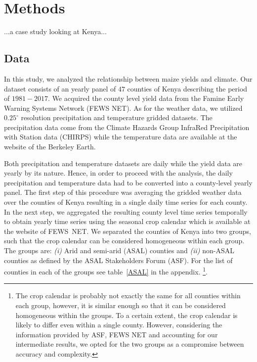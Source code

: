 \documentclass[12pt]{iopart}
\begin{document}
\section{Methods}\label{Methods}
\color{blue}

...a case study looking at Kenya...
\color{black}


 
\subsection{Data}\label{Data}

In this study, we analyzed the relationship between maize yields and climate. Our dataset consists of an yearly panel of $47$ counties of Kenya describing the period of $1981-2017$. 
	We acquired the county level yield data from the Famine Early Warning Systems Network (FEWS NET). As for the weather data, we utilized $0.25^\circ$ resolution precipitation and temperature gridded datasets. The precipitation data come from the Climate Hazards Group InfraRed Precipitation with Station data (CHIRPS) while the temperature data are available at the website of the Berkeley Earth. 
	
	Both precipitation and temperature datasets are daily while the yield data are yearly by its nature. Hence, in order to proceed with the analysis, the daily precipitation and temperature data had to be converted
into a county-level yearly panel. The first step of this procedure was averaging the gridded weather data over the counties of Kenya resulting in a single daily time series for each county. In the next step, we aggregated the resulting county level time series temporally to obtain yearly time series using the seasonal crop calendar which is available at the website of FEWS~NET. We separated the counties of Kenya into two groups, such that the crop calendar can be considered homogeneous within each group. The groups are: \textit{(i)} Arid and semi-arid (ASAL) counties and \textit{(ii)} non-ASAL counties as defined by the ASAL Stakeholders Forum (ASF). For the list of counties in each of the groups see table~\ref{ASAL} in the appendix. \footnote{The crop calendar is probably not exactly the same for all counties within each group, however, it is similar enough so that it can be considered homogeneous within the groups. To a certain extent, the crop calendar is likely to differ even within a single county. However, considering the information provided by ASF, FEWS NET and accounting for our intermediate results, we opted for the two groups as a compromise between accuracy and complexity.}. 
\end{document}
